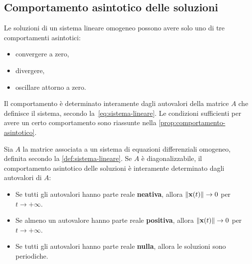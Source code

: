 \subsection{Comportamento asintotico delle soluzioni}
\label{subsec:comportamento-asintotico}
Le soluzioni di un sistema lineare omogeneo possono avere solo uno di tre comportamenti asintotici:
\begin{itemize}
    \item convergere a zero,
    \item divergere,
    \item oscillare attorno a zero.
\end{itemize}
Il comportamento è determinato interamente dagli autovalori della matrice $A$ che definisce il
sistema, secondo la~\eqref{eq:sistema-lineare}.
Le condizioni sufficienti per avere un certo comportamento sono riassunte nella \autoref{prop:comportamento-asintotico}.
\begin{prop}
    Sia $A$ la matrice associata a un sistema di equazioni differenziali omogeneo,
    definita secondo la \autoref{def:sistema-lineare}.
    Se $A$ è diagonalizzabile, il comportamento asintotico delle soluzioni è interamente
    determinato dagli autovalori di $A$:
    \begin{itemize}
        \item Se tutti gli autovalori hanno parte reale \textbf{neativa}, allora $\lVert\mathbf{x}(t)\rVert \to 0$ per $t \to +\infty$.%
        \item Se almeno un autovalore hanno parte reale \textbf{positiva}, allora $\lVert\mathbf{x}(t)\rVert \to 0$ per $t \to +\infty$.%
        \item Se tutti gli autovalori hanno parte reale \textbf{nulla}, allora le soluzioni sono periodiche.
    \end{itemize}
    \label{prop:comportamento-asintotico}
\end{prop}

